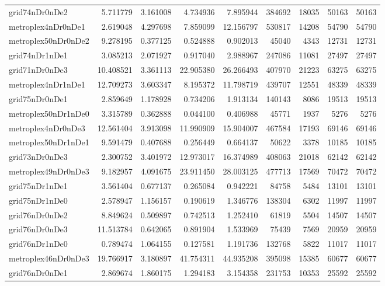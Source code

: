 \begin{longtable}{|l|r|r|r|r|r|r|r|r|}
grid74nDr0nDe2 & 5.711779 & 3.161008 & 4.734936 & 7.895944 & 384692 & 18035 & 50163 & 50163 \\
metroplex4nDr0nDe1 & 2.619048 & 4.297698 & 7.859099 & 12.156797 & 530817 & 14208 & 54790 & 54790 \\
metroplex50nDr0nDe2 & 9.278195 & 0.377125 & 0.524888 & 0.902013 & 45040 & 4343 & 12731 & 12731 \\
grid74nDr1nDe1 & 3.085213 & 2.071927 & 0.917040 & 2.988967 & 247086 & 11081 & 27497 & 27497 \\
grid71nDr0nDe3 & 10.408521 & 3.361113 & 22.905380 & 26.266493 & 407970 & 21223 & 63275 & 63275 \\
metroplex4nDr1nDe1 & 12.709273 & 3.603347 & 8.195372 & 11.798719 & 439707 & 12551 & 48339 & 48339 \\
grid75nDr0nDe1 & 2.859649 & 1.178928 & 0.734206 & 1.913134 & 140143 & 8086 & 19513 & 19513 \\
metroplex50nDr1nDe0 & 3.315789 & 0.362888 & 0.044100 & 0.406988 & 45771 & 1937 & 5276 & 5276 \\
metroplex4nDr0nDe3 & 12.561404 & 3.913098 & 11.990909 & 15.904007 & 467584 & 17193 & 69146 & 69146 \\
metroplex50nDr1nDe1 & 9.591479 & 0.407688 & 0.256449 & 0.664137 & 50622 & 3378 & 10185 & 10185 \\
grid73nDr0nDe3 & 2.300752 & 3.401972 & 12.973017 & 16.374989 & 408063 & 21018 & 62142 & 62142 \\
metroplex49nDr0nDe3 & 9.182957 & 4.091675 & 23.911450 & 28.003125 & 477713 & 17569 & 70472 & 70472 \\
grid75nDr1nDe1 & 3.561404 & 0.677137 & 0.265084 & 0.942221 & 84758 & 5484 & 13101 & 13101 \\
grid75nDr1nDe0 & 2.578947 & 1.156157 & 0.190619 & 1.346776 & 138304 & 6302 & 11997 & 11997 \\
grid76nDr0nDe2 & 8.849624 & 0.509897 & 0.742513 & 1.252410 & 61819 & 5504 & 14507 & 14507 \\
grid76nDr0nDe3 & 11.513784 & 0.642065 & 0.891904 & 1.533969 & 75439 & 7569 & 20959 & 20959 \\
grid76nDr1nDe0 & 0.789474 & 1.064155 & 0.127581 & 1.191736 & 132768 & 5822 & 11017 & 11017 \\
metroplex46nDr0nDe3 & 19.766917 & 3.180897 & 41.754311 & 44.935208 & 395098 & 15385 & 60677 & 60677 \\
grid76nDr0nDe1 & 2.869674 & 1.860175 & 1.294183 & 3.154358 & 231753 & 10353 & 25592 & 25592 \\

\end{longtable}
